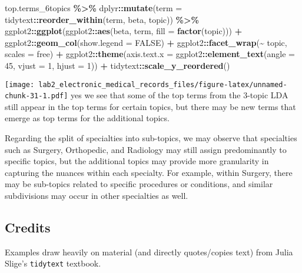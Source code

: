 \documentclass[
]{article}
\newenvironment{Shaded}{\begin{snugshade}}{\end{snugshade}}
\newcommand{\AttributeTok}[1]{\textcolor[rgb]{0.13,0.29,0.53}{#1}}
\newcommand{\ConstantTok}[1]{\textcolor[rgb]{0.56,0.35,0.01}{#1}}
\newcommand{\DecValTok}[1]{\textcolor[rgb]{0.00,0.00,0.81}{#1}}
\newcommand{\FunctionTok}[1]{\textcolor[rgb]{0.13,0.29,0.53}{\textbf{#1}}}
\newcommand{\NormalTok}[1]{#1}
\newcommand{\SpecialCharTok}[1]{\textcolor[rgb]{0.81,0.36,0.00}{\textbf{#1}}}
\newcommand{\StringTok}[1]{\textcolor[rgb]{0.31,0.60,0.02}{#1}}
\begin{document}
\begin{Shaded}
\begin{Highlighting}[]
\NormalTok{top.terms\_6topics }\SpecialCharTok{\%\textgreater{}\%}
\NormalTok{  dplyr}\SpecialCharTok{::}\FunctionTok{mutate}\NormalTok{(}\AttributeTok{term =}\NormalTok{ tidytext}\SpecialCharTok{::}\FunctionTok{reorder\_within}\NormalTok{(term, beta, topic)) }\SpecialCharTok{\%\textgreater{}\%}
\NormalTok{  ggplot2}\SpecialCharTok{::}\FunctionTok{ggplot}\NormalTok{(ggplot2}\SpecialCharTok{::}\FunctionTok{aes}\NormalTok{(beta, term, }\AttributeTok{fill =} \FunctionTok{factor}\NormalTok{(topic))) }\SpecialCharTok{+}
\NormalTok{  ggplot2}\SpecialCharTok{::}\FunctionTok{geom\_col}\NormalTok{(}\AttributeTok{show.legend =} \ConstantTok{FALSE}\NormalTok{) }\SpecialCharTok{+}
\NormalTok{  ggplot2}\SpecialCharTok{::}\FunctionTok{facet\_wrap}\NormalTok{(}\SpecialCharTok{\textasciitilde{}}\NormalTok{ topic, }\AttributeTok{scales =} \StringTok{\textquotesingle{}free\textquotesingle{}}\NormalTok{) }\SpecialCharTok{+}
\NormalTok{  ggplot2}\SpecialCharTok{::}\FunctionTok{theme}\NormalTok{(}\AttributeTok{axis.text.x =}\NormalTok{ ggplot2}\SpecialCharTok{::}\FunctionTok{element\_text}\NormalTok{(}\AttributeTok{angle =} \DecValTok{45}\NormalTok{, }\AttributeTok{vjust =} \DecValTok{1}\NormalTok{, }\AttributeTok{hjust =} \DecValTok{1}\NormalTok{)) }\SpecialCharTok{+}
\NormalTok{  tidytext}\SpecialCharTok{::}\FunctionTok{scale\_y\_reordered}\NormalTok{()}
\end{Highlighting}
\end{Shaded}

\texttt{[image: lab2\_electronic\_medical\_records\_files/figure-latex/unnamed-chunk-31-1.pdf]}
yes we see that some of the top terms from the 3-topic LDA still appear
in the top terms for certain topics, but there may be new terms that
emerge as top terms for the additional topics.

Regarding the split of specialties into sub-topics, we may observe that
specialties such as Surgery, Orthopedic, and Radiology may still assign
predominantly to specific topics, but the additional topics may provide
more granularity in capturing the nuances within each specialty. For
example, within Surgery, there may be sub-topics related to specific
procedures or conditions, and similar subdivisions may occur in other
specialties as well.

\subsection{Credits}\label{credits}

Examples draw heavily on material (and directly quotes/copies text) from
Julia Slige's \texttt{tidytext} textbook.
\end{document}
